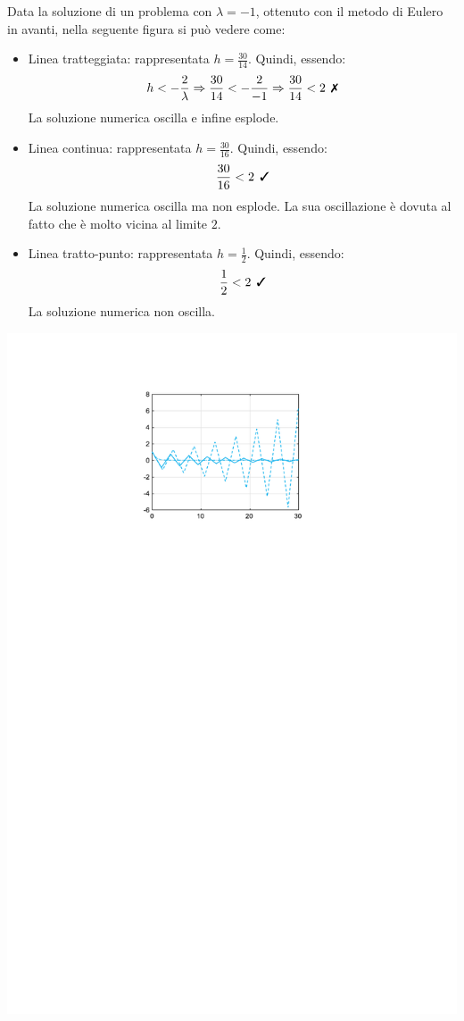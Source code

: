 \begin{examplebox}
	Data la soluzione di un problema con $\lambda = -1$, ottenuto con il metodo di Eulero in avanti, nella seguente figura si può vedere come:
	\begin{itemize}
		\item Linea tratteggiata: rappresentata $h = \frac{30}{14}$. Quindi, essendo:
		\begin{equation*}
			h < -\dfrac{2}{\lambda} \Rightarrow \dfrac{30}{14} < -\dfrac{2}{-1} \Rightarrow \dfrac{30}{14} < 2 \:\: \text{\ding{55}}
		\end{equation*}
		La soluzione numerica oscilla e infine esplode.
		
		\item Linea continua: rappresentata $h = \frac{30}{16}$. Quindi, essendo:
		\begin{equation*}
			\dfrac{30}{16} < 2 \:\: \text{\ding{51}}
		\end{equation*}
		La soluzione numerica oscilla ma non esplode. La sua oscillazione è dovuta al fatto che è molto vicina al limite $2$.
		
		\item Linea tratto-punto: rappresentata $h = \frac{1}{2}$. Quindi, essendo:
		\begin{equation*}
			\dfrac{1}{2} < 2 \:\: \text{\ding{51}}
		\end{equation*}
		La soluzione numerica non oscilla.
	\end{itemize}
	\begin{center}
		\includegraphics[width=.6\textwidth]{img/metodo-di-eulero-1.pdf}
	\end{center}
\end{examplebox}

